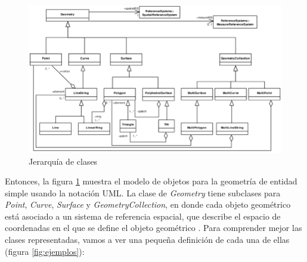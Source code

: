 \begin{figure}[H]
	\centering
	\includegraphics[width=1\linewidth]{imagenes/capitulo4/The-classes-of-geometries-in-WKT-figure-from-4}
	\caption{Jerarquía de clases \cite{estandar}}
	\label{fig:the-clases-geometry}
\end{figure}

Entonces, la figura \ref{fig:the-clases-geometry} muestra el modelo de objetos para la geometría de entidad simple usando la notación UML. La clase de \textit{Geometry} tiene subclases para \textit{Point}, \textit{Curve}, \textit{Surface} y \textit{GeometryCollection}, en donde cada objeto geométrico está asociado a un sistema de referencia espacial, que describe el espacio de coordenadas en el que se define el objeto geométrico \cite{estandar}. Para comprender mejor las clases representadas, vamos a ver una pequeña definición de cada una de ellas \cite{wkt-database} (figura \ref{fig:ejemplos}):


